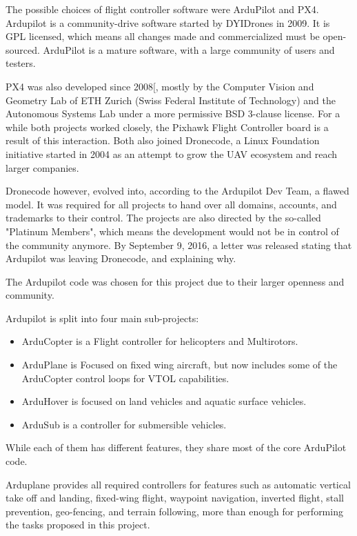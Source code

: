 The possible choices of flight controller software were ArduPilot and PX4.
%
Ardupilot is a community-drive software started by DYIDrones in 2009\cite{diydrones}.
%
It is GPL licensed, which means all changes made and commercialized must be open-sourced\cite{gplv3}.
%
ArduPilot is a mature software, with a large community of users and testers.
%

PX4 was also developed since 2008[\cite{waybackmachine}, mostly by the Computer Vision and Geometry Lab of ETH Zurich (Swiss Federal Institute of Technology)\cite{computervision} and the Autonomous Systems Lab\cite{autonomouslab} under a more permissive BSD 3-clause license\cite{bsd}.
%
For a while both projects worked closely, the Pixhawk Flight Controller board is a result of this interaction.
%
Both also joined Dronecode\cite{dronecode}, a Linux Foundation\cite{linuxfoundation} initiative started in 2004 as an attempt to grow the UAV ecosystem and reach larger companies.
%

Dronecode however, evolved into, according to the Ardupilot Dev Team, a flawed model.
%
It was required for all projects to hand over all domains, accounts, and trademarks to their control.
%
The projects are also directed by the so-called "Platinum Members", which means the development would not be in control of the community anymore.
%
By September 9, 2016, a letter was released stating that Ardupilot was leaving Dronecode, and explaining why\cite{letter}.

The Ardupilot code was chosen for this project due to their larger openness and community.

Ardupilot is split into four main sub-projects:
\begin{itemize}
\item ArduCopter is a Flight controller for helicopters and Multirotors.
\item ArduPlane is Focused on fixed wing aircraft, but now includes some of the ArduCopter control loops for VTOL capabilities.
\item ArduHover is focused on land vehicles and aquatic surface vehicles.
\item ArduSub is a controller for submersible vehicles.
\end{itemize}

While each of them has different features, they share most of the core ArduPilot code.

Arduplane provides all required controllers for features such as automatic vertical take off and landing, fixed-wing flight, waypoint navigation, inverted flight, stall prevention, geo-fencing, and terrain following, more than enough for performing the tasks proposed in this project.


